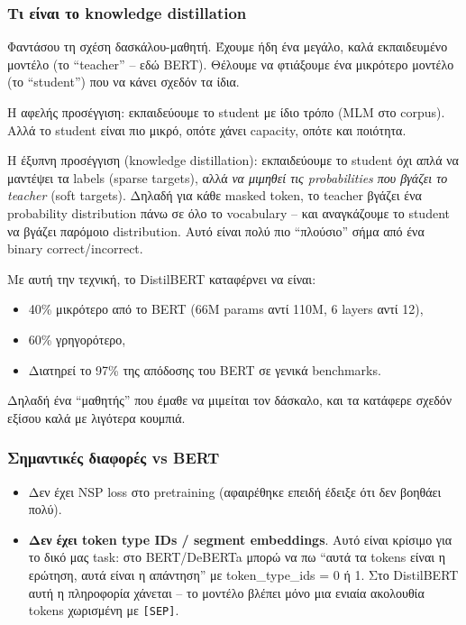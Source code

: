 \documentclass[12pt]{fphw}
\begin{document}
\subsubsection{Τι είναι το knowledge distillation}

Φαντάσου τη σχέση δασκάλου-μαθητή. Έχουμε ήδη ένα μεγάλο, καλά εκπαιδευμένο μοντέλο (το ``teacher'' -- εδώ BERT). Θέλουμε να φτιάξουμε ένα μικρότερο μοντέλο (το ``student'') που να κάνει σχεδόν τα ίδια.

Η αφελής προσέγγιση: εκπαιδεύουμε το student με ίδιο τρόπο (MLM στο corpus). Αλλά το student είναι πιο μικρό, οπότε χάνει capacity, οπότε και ποιότητα.

Η έξυπνη προσέγγιση (knowledge distillation): εκπαιδεύουμε το student όχι απλά να μαντέψει τα labels (sparse targets), αλλά \emph{να μιμηθεί τις probabilities που βγάζει το teacher} (soft targets). Δηλαδή για κάθε masked token, το teacher βγάζει ένα probability distribution πάνω σε όλο το vocabulary -- και αναγκάζουμε το student να βγάζει παρόμοιο distribution. Αυτό είναι πολύ πιο ``πλούσιο'' σήμα από ένα binary correct/incorrect.

Με αυτή την τεχνική, το DistilBERT καταφέρνει να είναι:
\begin{itemize}
    \item 40\% μικρότερο από το BERT (66M params αντί 110M, 6 layers αντί 12),
    \item 60\% γρηγορότερο,
    \item Διατηρεί το 97\% της απόδοσης του BERT σε γενικά benchmarks.
\end{itemize}

Δηλαδή ένα ``μαθητής'' που έμαθε να μιμείται τον δάσκαλο, και τα κατάφερε σχεδόν εξίσου καλά με λιγότερα κουμπιά.

\subsubsection{Σημαντικές διαφορές vs BERT}

\begin{itemize}
    \item Δεν έχει NSP loss στο pretraining (αφαιρέθηκε επειδή έδειξε ότι δεν βοηθάει πολύ).
    \item \textbf{Δεν έχει token type IDs / segment embeddings}. Αυτό είναι κρίσιμο για το δικό μας task: στο BERT/DeBERTa μπορώ να πω ``αυτά τα tokens είναι η ερώτηση, αυτά είναι η απάντηση'' με token\_type\_ids = 0 ή 1. Στο DistilBERT αυτή η πληροφορία χάνεται -- το μοντέλο βλέπει μόνο μια ενιαία ακολουθία tokens χωρισμένη με \texttt{[SEP]}.
\end{itemize}
\end{document}
